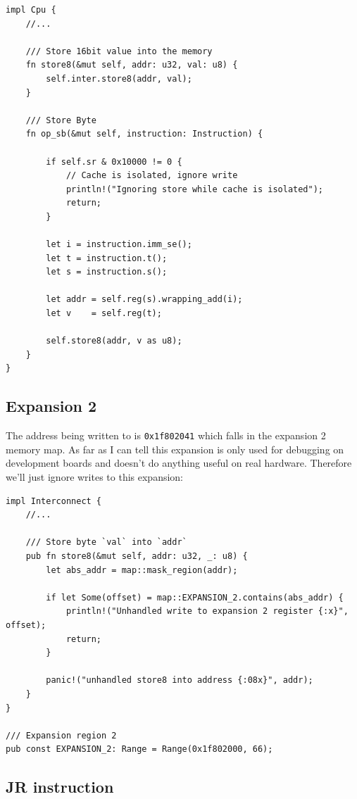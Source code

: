 \documentclass[a4paper]{article}
\newcommand{\code}[1] {\texttt{#1}}
\begin{document}
\begin{lstlisting}
impl Cpu {
    //...

    /// Store 16bit value into the memory
    fn store8(&mut self, addr: u32, val: u8) {
        self.inter.store8(addr, val);
    }

    /// Store Byte
    fn op_sb(&mut self, instruction: Instruction) {

        if self.sr & 0x10000 != 0 {
            // Cache is isolated, ignore write
            println!("Ignoring store while cache is isolated");
            return;
        }

        let i = instruction.imm_se();
        let t = instruction.t();
        let s = instruction.s();

        let addr = self.reg(s).wrapping_add(i);
        let v    = self.reg(t);

        self.store8(addr, v as u8);
    }
}
\end{lstlisting}

\subsection{Expansion 2}

The address being written to is \code{0x1f802041} which falls in the
expansion 2 memory map. As far as I can tell this expansion is only
used for debugging on development boards and doesn't do anything
useful on real hardware. Therefore we'll just ignore writes to this
expansion:

\begin{lstlisting}
impl Interconnect {
    //...

    /// Store byte `val` into `addr`
    pub fn store8(&mut self, addr: u32, _: u8) {
        let abs_addr = map::mask_region(addr);

        if let Some(offset) = map::EXPANSION_2.contains(abs_addr) {
            println!("Unhandled write to expansion 2 register {:x}", offset);
            return;
        }

        panic!("unhandled store8 into address {:08x}", addr);
    }
}

/// Expansion region 2
pub const EXPANSION_2: Range = Range(0x1f802000, 66);
\end{lstlisting}

\subsection{JR instruction}
\end{document}
